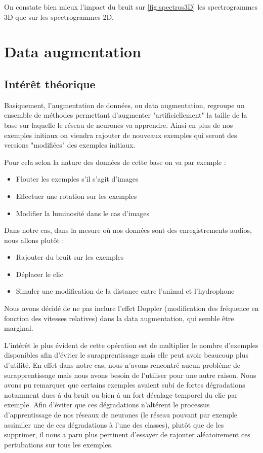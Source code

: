 On constate bien mieux l'impact du bruit sur \ref{fig:spectros3D} les spectrogrammes 3D que sur les spectrogrammes 2D.

\hypertarget{Data-augmentation}{%
\section{Data augmentation}
\label{Data-augmentation}}

\hypertarget{}{%
\subsection{Intérêt théorique}
\label{interets_theoriques}}

Basiquement, l'augmentation de données, ou data augmentation, regroupe un ensemble de méthodes permettant d'augmenter "artificiellement" la taille de la base sur laquelle le réseau de neurones va apprendre. Ainsi en plus de nos exemples initiaux on viendra rajouter de nouveaux exemples qui seront des versions "modifiées" des exemples initiaux.

Pour cela selon la nature des données de cette base on va par exemple :
\begin{itemize}
\item Flouter les exemples s'il s'agit d'images
\item Effectuer une rotation sur les exemples
\item Modifier la luminosité dans le cas d'images
\end{itemize}

Dans notre cas, dans la mesure où nos données sont des enregistrements audios, nous allons plutôt :
\begin{itemize}
\item Rajouter du bruit sur les exemples
\item Déplacer le clic
\item Simuler une modification de la distance entre l'animal et l'hydrophone
\end{itemize}

Nous avons décidé de ne pas inclure l'effet Doppler (modification des fréquence en fonction des vitesses relatives) dans la data augmentation, qui semble être
marginal.

L'intérêt le plus évident de cette opération est de multiplier le nombre d'exemples disponibles afin d'éviter le surapprentissage mais elle peut avoir beaucoup plus d'utilité.
En effet dans notre cas, nous n'avons rencontré aucun probléme de surapprentissage mais nous avons besoin de l'utiliser pour une autre raison.
Nous avons pu remarquer que certains exemples avaient subi de fortes dégradations notamment dues
à du bruit ou bien à un fort décalage temporel du clic par exemple.
Afin d'éviter que ces dégradations n'altérent le processus d'apprentissage de nos réseaux de neurones (le réseau pouvant par exemple assimiler une de ces dégradations à l'une des classes),
plutôt que de les supprimer, il nous a paru plus pertinent d'essayer de rajouter aléatoirement ces
pertubations sur tous les exemples.


